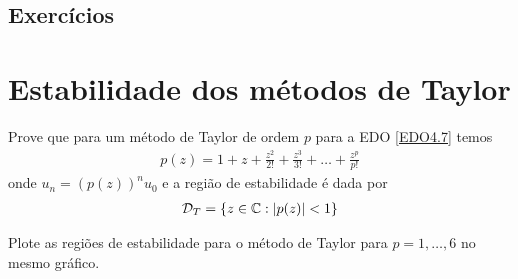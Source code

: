 \emconstrucao

\subsection*{Exercícios}

\emconstrucao

\section{Estabilidade dos métodos de Taylor}
\begin{ex}
Prove que para um método de Taylor de ordem $p$ para a EDO \eqref{EDO4.7} temos
\begin{eqnarray}
  p(z)= 1 + z+ \frac{z^2}{2!} +\frac{z^3}{3!}+\ldots +\frac{z^p}{p!}
\end{eqnarray}
onde  $u_n = (p(z))^nu_0$ e a região de estabilidade é dada por
\begin{eqnarray}
 \mathcal D_{T} = \{z \in  \mathbb{C}:  \left|p(z)\right|<1\}
\end{eqnarray}

Plote as regiões de estabilidade para o método de Taylor para $p=1,\ldots ,6$ no mesmo gráfico.
\end{ex}



